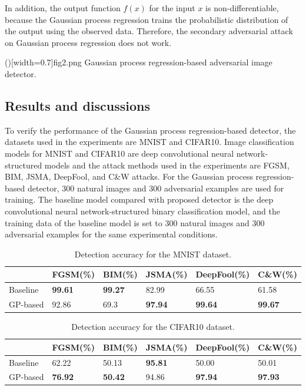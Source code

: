 \documentclass{ieeeaccess}
\begin{document}
In addition, the output function $f(x)$ for the input $x$ is non-differentiable, because the Gaussian process regression trains the probabilistic distribution of the output using the observed data. 
Therefore, the secondary adversarial attack on Gaussian process regression does not work.

\Figure[t]()[width=0.7\textwidth]{fig2.png}
   {Gaussian process regression-based adversarial image detector.\label{fig2}}
	
\subsection{Results and discussions}
To verify the performance of the Gaussian process regression-based detector, the datasets used in the experiments are MNIST and CIFAR10.
Image classification models for MNIST and CIFAR10 are deep convolutional neural network-structured models and the attack methods used in the experiments are FGSM, BIM, JSMA, DeepFool, and C\&W attacks.
For the Gaussian process regression-based detector, 300 natural images and 300 adversarial examples are used for training. 
The baseline model compared with proposed detector is the deep convolutional neural network-structured binary classification model, and the training data of the baseline model is set to 300 natural images and 300 adversarial examples for the same experimental conditions.

\begin{table}[t]
	\centering
	\caption{Detection accuracy for the MNIST dataset.}
		\begin{tabular}{|p{1.5cm}|p{1.5cm}|p{1.5cm}|p{1.5cm}|p{1.5cm}|p{1.5cm}|}
			\hline
			& \textbf{FGSM(\%)} & \textbf{BIM(\%)} & \textbf{JSMA(\%)} & \textbf{DeepFool(\%)} & \textbf{C\&W(\%)} \\	\hline \hline
			Baseline & \textbf{99.61} & \textbf{99.27} & 82.99 & 66.55 & 61.58 \\	\hline
			GP-based & 92.86 & 69.3 & \textbf{97.94} & \textbf{99.64} & \textbf{99.67} \\	\hline
		\end{tabular}
	\label{table1}
\end{table}

\begin{table}[t]
	\centering
	\caption{Detection accuracy for the CIFAR10 dataset.}
		\begin{tabular}{|p{1.5cm}|p{1.5cm}|p{1.5cm}|p{1.5cm}|p{1.5cm}|p{1.5cm}|}
			\hline
			& \textbf{FGSM(\%)} & \textbf{BIM(\%)} & \textbf{JSMA(\%)} & \textbf{DeepFool(\%)} & \textbf{C\&W(\%)} \\	\hline \hline
			Baseline & 62.22 & 50.13 & \textbf{95.81} & 50.00 & 50.01 \\ \hline
			GP-based & \textbf{76.92} & \textbf{50.42} & 94.86 & \textbf{97.94} & \textbf{97.93} \\	\hline
		\end{tabular}
	\label{table2}
\end{table}
\end{document}
